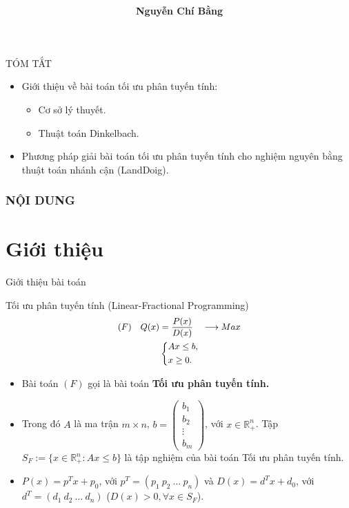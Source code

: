 \documentclass{beamer}
\title[]{\fontsize{13pt}{10pt}\selectfont {\bf \LARGE Tối ưu phân tuyến tính \\ cho nghiệm nguyên}\\}
\author[]{\bf Nguyễn Chí Bằng \\}
\begin{document}
\begin{frame}
    \titlepage
\end{frame}

\begin{frame}{TÓM TẮT}
\Large
\begin{itemize}
\item Giới thiệu về bài toán tối ưu phân tuyến tính:
\begin{itemize} \Large
\item Cơ sở lý thuyết.
\item Thuật toán Dinkelbach.
\end{itemize}
\item Phương pháp giải bài toán tối ưu phân tuyến tính cho nghiệm nguyên bằng thuật toán nhánh cận (LandDoig).
\end{itemize}
\end{frame}

\begin{frame}
    \frametitle{NỘI DUNG}
    \tableofcontents
\end{frame}

\section{Giới thiệu}

\begin{frame}
   \center 
   \huge Giới thiệu bài toán 
\end{frame}

\begin{frame}{Tối ưu phân tuyến tính (Linear-Fractional Programming)}
    \begin{equation} \small \label{F}
        \begin{split}
        (F) \quad Q(x) & = \frac{P(x)}{D(x)} \quad \longrightarrow Max \\
            & \left\{
            \begin{split}
            &Ax \leq  b, \\
            &x \geq 0. \\
            \end{split}
            \right.    
        \end{split}
    \end{equation}            
    \begin{itemize} \small
    \item Bài toán $(F)$ gọi là bài toán \textbf{Tối ưu phân tuyến tính.}
    \item Trong đó $A$ là ma trận $m\times n$, $b=\begin{pmatrix}
        b_1 \\
        b_2 \\
        \vdots \\
        b_m
        \end{pmatrix}$, với $x\in \mathbb{R}^n_+$. Tập $S_F:=\{x\in \mathbb{R}^n_+: Ax\leq b\}$ là tập nghiệm của bài toán Tối ưu phân tuyến tính. 
    \item $P(x)=p^Tx+p_0$, với $p^T = (p_1 \: p_2 \: \ldots \: p_n)$ và $D(x)=d^Tx+d_0$, với $d^T = (d_1 \: d_2 \: \ldots \: d_n)$ ($D(x)>0, \forall x \in S_F$).
    \end{itemize}
\end{frame}
\end{document}
